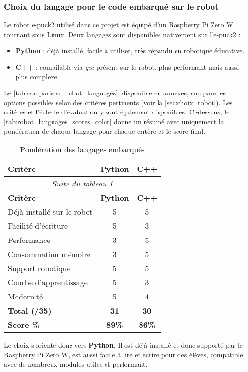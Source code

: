 \subsubsection{Choix du langage pour le code embarqué sur le robot} \label{sec:robot_code}

Le robot e-puck2 utilisé dans ce projet est équipé d’un Raspberry Pi Zero W tournant sous Linux.
Deux langages sont disponibles nativement sur l’e‑puck2 :
\begin{itemize}
  \item \textbf{Python} : déjà installé, facile à utiliser, très répandu en robotique éducative.
  \item \textbf{C++} : compilable via \textit{gcc} présent sur le robot, plus performant mais aussi plus complexe.
\end{itemize}

Le \autoref{tab:comparison_robot_languages}, disponible en annexes, compare les options possibles selon des critères pertinents (voir la \autoref{sec:choix_robot}).
Les critères et l'échelle d'évaluation y sont également disponibles.
Ci-dessous, le \autoref{tab:robot_languages_scores_color} donne un résumé avec uniquement la pondération de chaque langage pour chaque critère et le score final.

\begin{longtable}[H]{|p{}|c|c|}
\caption{\label{tab:robot_languages_scores_color} Pondération des langages embarqués} \\

\hline
\textbf{Critère} & \textbf{Python} & \textbf{C++} \\
\hline
\endfirsthead

\multicolumn{3}{c}{\textit{Suite du tableau \ref{tab:robot_languages_scores_color}}} \\
\hline
\textbf{Critère} & \textbf{Python} & \textbf{C++} \\
\hline
\endhead

Déjà installé sur le robot       & \cellcolor{green!20}5 & \cellcolor{green!20}5 \\
Facilité d’écriture              & \cellcolor{green!20}5 & \cellcolor{yellow!30}3 \\
Performance                      & \cellcolor{yellow!30}3 & \cellcolor{green!20}5 \\
Consommation mémoire             & \cellcolor{yellow!30}3 & \cellcolor{green!20}5 \\
Support robotique                & \cellcolor{green!20}5 & \cellcolor{green!20}5 \\
Courbe d’apprentissage           & \cellcolor{green!20}5 & \cellcolor{yellow!30}3 \\
Modernité                        & \cellcolor{green!20}5 & \cellcolor{blue!15}4 \\
\hline
\textbf{Total (/35)}             & \cellcolor{green!25}\textbf{31} & \cellcolor{green!20}\textbf{30} \\
\hline
\textbf{Score \%}                & \cellcolor{green!25}\textbf{89\%} & \cellcolor{green!20}\textbf{86\%} \\
\hline

\end{longtable}

Le choix s’oriente donc vers \textbf{Python}.
Il est déjà installé et donc supporté par le Raspberry Pi Zero W, est aussi facile à lire et écrire pour des élèves, compatible avec de nombreux modules utiles et performant.
